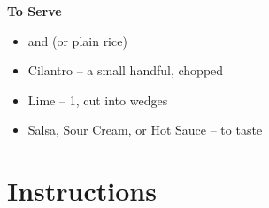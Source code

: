 \textbf{To Serve}
\begin{itemize}[itemsep=0.1em, label={\raisebox{-0.1ex}{\large\textbullet}}]
      \item {} and  (or plain rice)
      \item[\cut] Cilantro – a small handful, chopped
      \item[\cut] Lime – 1, cut into wedges
      \item Salsa, Sour Cream, or Hot Sauce – to taste
\end{itemize}

\newpage
{}
\section*{Instructions}

